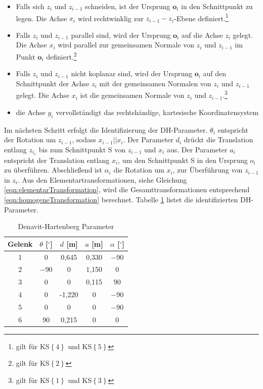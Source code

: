 \begin{itemize}
	\item Falls sich $z_i$ und $z_{i-1}$ schneiden, ist der Ursprung $\bm{o}_i$ in den Schnittpunkt zu legen. Die Achse $x_i$ wird rechtwinklig zur $z_{i-1}-z_i$-Ebene definiert.\footnote{gilt für KS$\left\{4\right\}$ und KS$\left\{5\right\}$} 
	\item Falls  $z_i$ und $z_{i-1}$ parallel sind, wird der Ursprung $\bm{o}_i$ auf die Achse $z_i$ gelegt. Die Achse $x_i$ wird parallel zur gemeinsamen Normale von $z_i$ und $z_{i-1}$	im Punkt $\bm{o}_i$ definiert.\footnote{gilt für KS$\left\{2\right\}$} 
	\item Falls  $z_i$ und $z_{i-1}$ nicht koplanar sind, wird der Ursprung $\bm{o}_i$ auf den Schnittpunkt der Achse $z_i$ mit der gemeinsamen Normalen von $z_i$ und $z_{i-1}$  gelegt. Die Achse $x_i$ ist die gemeinsamen Normale von $z_i$ und $z_{i-1}$.\footnote{gilt für KS$\left\{1\right\}$ und KS$\left\{3\right\}$}
	\item die Achse $y_i$ vervollständigt das rechtshändige, kartesische Koordinatensystem
\end{itemize} 
%
Im nächsten Schritt erfolgt die Identifizierung der DH-Parameter.  $\theta_i$ entspricht der Rotation um $z_{i-1}$, sodass $x_{i-1}||x_i$. Der Parameter $d_i$ drückt die Translation entlang $z_{i_1}$ bis zum Schnittpunkt S von $z_{i-1}$ und $x_i$ aus. Der Parameter $a_i$ entspricht der Translation entlang $x_i$, um den Schnittpunkt S in den Ursprung $o_i$ zu überführen. Abschließend ist $\alpha_i$ die Rotation um $x_i$, zur Überführung von $z_{i-1}$ in $z_i$. Aus den Elementartransformationen, siehe Gleichung \ref{eqn:elementarTransformation}, wird die Gesamttransformationen entsprechend \ref{eqn:homogeneTransformation} berechnet. Tabelle \ref{tab:dh} listet die identifizierten DH-Parameter. 

\begin{table}[tbph]
	\centering
	\caption{Denavit-Hartenberg Parameter}
	\label{tab:dh}
	\begin{tabular}{|c|c|c|c|c|}
		\hline
		Gelenk & $\theta$ [$^\circ$] & $d$ [m] & $a$ [m] & $\alpha$ [$^\circ$]\\
		\hline
		1& 0 & 0,645 & 0,330 & $-90$ \\
		\hline
		2& $-90$ & 0 & 1,150 & 0 \\
		\hline
		3& 0 & 0 & 0,115 & $90$ \\
		\hline
		4& 0 & -1,220 & 0 & $-90$ \\
		\hline
		5& 0 & 0 & 0 & $-90$ \\
		\hline
		6& $90$ & 0,215 & 0 & 0 \\
		\hline
	\end{tabular}
\end{table}

